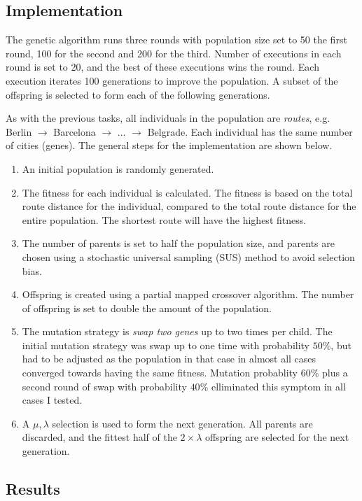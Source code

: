 \documentclass{article}
\begin{document}
\subsection*{Implementation}

The genetic algorithm runs three rounds with population size set to 50 the first round, 100 for the second and 200 for the third. Number of executions in each round is set to 20, and the best of these executions wins the round. Each execution iterates 100 generations to improve the population. A subset of the offspring is selected to form each of the following generations.

As with the previous tasks, all individuals in the population are \textit{routes}, e.g. Berlin $\rightarrow$ Barcelona $\rightarrow$ $\ldots$ $\rightarrow$ Belgrade. Each individual has the same number of cities (genes). The general steps for the implementation are shown below.

\begin{enumerate}
    \item An initial population is randomly generated.
    \item The fitness for each individual is calculated. The fitness is based on the total route distance for the individual, compared to the total route distance for the entire population. The shortest route will have the highest fitness.
    \item The number of parents is set to half the population size, and parents are chosen using a stochastic universal sampling (SUS) method to avoid selection bias.
    \item Offspring is created using a partial mapped crossover algorithm. The number of offspring is set to double the amount of the population.
    \item The mutation strategy is \textit{swap two genes} up to two times per child. The initial mutation strategy was swap up to one time with probability $50\%$, but had to be adjusted as the population in that case in almost all cases converged towards having the same fitness. Mutation probablity $60\%$ plus a second round of swap with probability $40\%$ elliminated this symptom in all cases I tested.
    \item A $\mu,\lambda$ selection is used to form the next generation. All parents are discarded, and the fittest half of the $2 \times \lambda$ offspring are selected for the next generation.
\end{enumerate}

\subsection*{Results}
\end{document}
